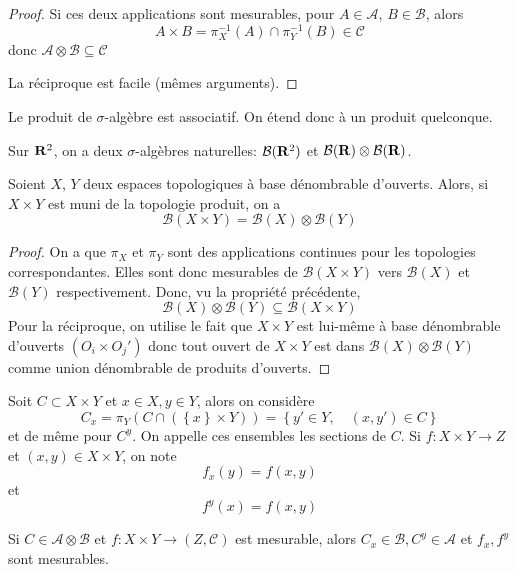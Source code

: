 \begin{proof}
Si ces deux applications sont mesurables, pour  $A \in \mathcal  A$, $B \in  \mathcal  B$, alors \[
    A\times B = \pi_X^{-1}(A)\cap \pi_Y^{-1}(B) \in  \mathcal  C
\] 
donc $\mathcal  A\otimes \mathcal  B\subseteq \mathcal  C$

La réciproque est facile (mêmes arguments).
\end{proof}

\begin{rem}
Le produit de $\sigma$-algèbre est associatif. On étend donc à un produit quelconque.
\end{rem}

\begin{ex}
    Sur $\mathbf R^2$, on a deux $\sigma$-algèbres naturelles:  $\mathcal  B(\mathbf R^2)$ et $\mathcal  B(\mathbf R)\otimes \mathcal  B(\mathbf R)$.
\end{ex}

\begin{prop}
Soient $X$,  $Y$ deux espaces topologiques à base dénombrable d'ouverts. Alors, si  $X\times Y$ est muni de la topologie produit, on a  \[
    \mathcal  B(X\times Y)=\mathcal  B(X)\otimes \mathcal  B(Y)
\] 
\end{prop}

\begin{proof}
    On a que $\pi_X$ et $\pi_Y$ sont des applications continues pour les topologies correspondantes. Elles sont donc mesurables de $\mathcal  B(X\times Y)$ vers $\mathcal  B(X)$ et $\mathcal  B(Y)$ respectivement. Donc, vu la propriété précédente, \[
        \mathcal  B(X)\otimes \mathcal  B(Y)\subseteq\mathcal B(X\times Y)
    \] 
    Pour la réciproque, on utilise le fait que $X\times Y$ est lui-même à base dénombrable d'ouverts  $(O_i\times O_j')$ donc tout ouvert de  $X\times Y$ est dans  $\mathcal  B(X)\otimes \mathcal  B(Y)$ comme union dénombrable de produits d'ouverts.
\end{proof}

\begin{dfn}
Soit $C\subset X\times Y$ et  $x \in  X, y \in  Y$, alors on considère \[
    C_x=\pi_Y(C\cap (\left\{ x \right\}\times Y ))= \left\{ y' \in Y, \quad  (x, y') \in C \right\} 
\] 
et de même pour $C^y$. On appelle ces ensembles les sections de  $C$. Si $f: X\times Y \longrightarrow  Z$ et $(x, y) \in  X\times Y$, on note \[
    f_x(y)=f(x, y)
\] 
et \[
    f^y(x)=f(x, y)
\] 
\end{dfn}

\begin{prop}
    Si $C \in  \mathcal  A\otimes \mathcal  B$ et $f:X\times Y \longrightarrow (Z, \mathcal  C)$ est mesurable, alors $C_x \in  \mathcal  B, C^y \in  \mathcal  A$ et $f_x, f^y$ sont mesurables.
\end{prop}

